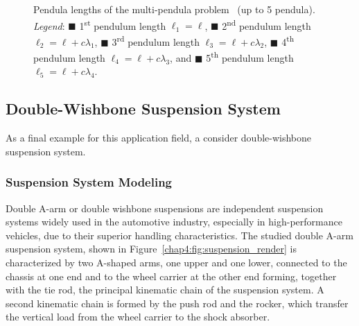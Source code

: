 \begin{figure}[htb]
  \centering
  \small{}
  \caption{Pendula lengths of the multi-pendula problem~\cite{nedialkov2008solvingIII} (up to 5 pendula). \emph{Legend}: \textcolor{mycolor1}{$\blacksquare$} 1\textsuperscript{st} pendulum length $\ell_1 = \ell$, \textcolor{mycolor2}{$\blacksquare$} 2\textsuperscript{nd} pendulum length $\ell_2 = \ell + c\lambda_1$, \textcolor{mycolor3}{$\blacksquare$} 3\textsuperscript{rd} pendulum length $\ell_3 = \ell + c\lambda_2$, \textcolor{mycolor4}{$\blacksquare$} 4\textsuperscript{th} pendulum length $\ell_4 = \ell + c\lambda_3$, and \textcolor{mycolor5}{$\blacksquare$} 5\textsuperscript{th} pendulum length $\ell_5 = \ell + c\lambda_4$.}
  \label{chap4:fig:npendula_length}
\end{figure}

\subsection{Double-Wishbone Suspension System}

As a final example for this application field, a consider double-wishbone suspension system.

\subsubsection{Suspension System Modeling}

Double A-arm or double wishbone suspensions are independent suspension systems widely used in the automotive industry, especially in high-performance vehicles, due to their superior handling characteristics. The studied double A-arm suspension system, shown in Figure~\ref{chap4:fig:suspension_render} is characterized by two A-shaped arms, one upper and one lower, connected to the chassis at one end and to the wheel carrier at the other end forming, together with the tie rod, the principal kinematic chain of the suspension system. A second kinematic chain is formed by the push rod and the rocker, which transfer the vertical load from the wheel carrier to the shock absorber.

